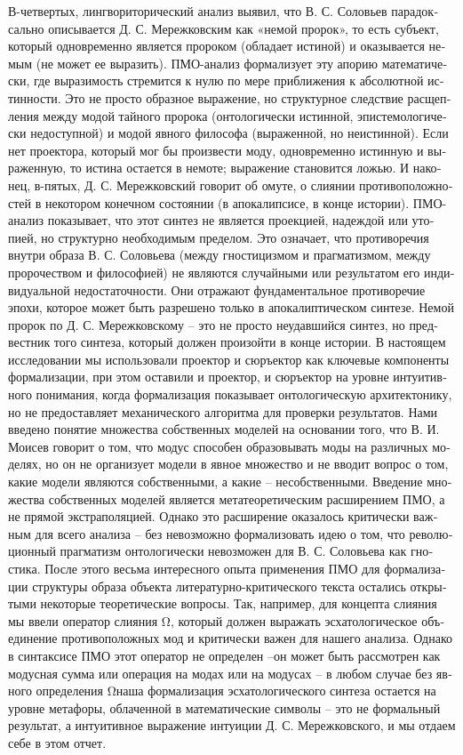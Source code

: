 \begin{russian}
    В-четвертых, лингвориторический анализ выявил, что В. С. Соловьев парадоксально описывается Д. С. Мережковским как «немой пророк», то есть субъект, который одновременно является пророком (обладает истиной) и оказывается немым (не может ее выразить). ПМО-анализ формализует эту апорию математически, где выразимость стремится к нулю по мере приближения к абсолютной истинности. Это не просто образное выражение, но структурное следствие расщепления между модой тайного пророка (онтологически истинной, эпистемологически недоступной) и модой явного философа (выраженной, но неистинной). Если нет проектора, который мог бы произвести моду, одновременно истинную и выраженную, то истина остается в немоте; выражение становится ложью.
    И наконец, в-пятых, Д. С. Мережковский говорит об омуте, о слиянии противоположностей в некотором конечном состоянии (в апокалипсисе, в конце истории). ПМО-анализ показывает, что этот синтез не является проекцией, надеждой или утопией, но структурно необходимым пределом. Это означает, что противоречия внутри образа В. С. Соловьева (между гностицизмом и прагматизмом, между пророчеством и философией) не являются случайными или результатом его индивидуальной недостаточности. Они отражают фундаментальное противоречие эпохи, которое может быть разрешено только в апокалиптическом синтезе. Немой пророк по Д. С. Мережковскому – это не просто неудавшийся синтез, но предвестник того синтеза, который должен произойти в конце истории.
    В настоящем исследовании мы использовали проектор и сюръектор как ключевые компоненты формализации, при этом оставили и проектор, и сюръектор на уровне интуитивного понимания, когда формализация показывает онтологическую архитектонику, но не предоставляет механического алгоритма для проверки результатов.
    Нами введено понятие множества собственных моделей на основании того, что В. И. Моисев говорит о том, что модус способен образовывать моды на различных моделях, но он не организует модели в явное множество и не вводит вопрос о том, какие модели являются собственными, а какие – несобственными. Введение множества собственных моделей является метатеоретическим расширением ПМО, а не прямой экстраполяцией. Однако это расширение оказалось критически важным для всего анализа – без невозможно формализовать идею о том, что революционный прагматизм онтологически невозможен для В. С. Соловьева как гностика.
    После этого весьма интересного опыта применения ПМО для формализации структуры образа объекта литературно-критического текста остались открытыми некоторые теоретические вопросы. Так, например, для концепта слияния мы ввели оператор слияния Ω\Omega, который должен выражать эсхатологическое объединение противоположных мод и критически важен для нашего анализа. Однако в синтаксисе ПМО этот оператор не определен –он может быть рассмотрен как модусная сумма или операция на модах или на модусах – в любом случае без явного определения Ω\Omega наша формализация эсхатологического синтеза остается на уровне метафоры, облаченной в математические символы – это не формальный результат, а интуитивное выражение интуиции Д. С. Мережковского, и мы отдаем себе в этом отчет. 

\end{russian}
